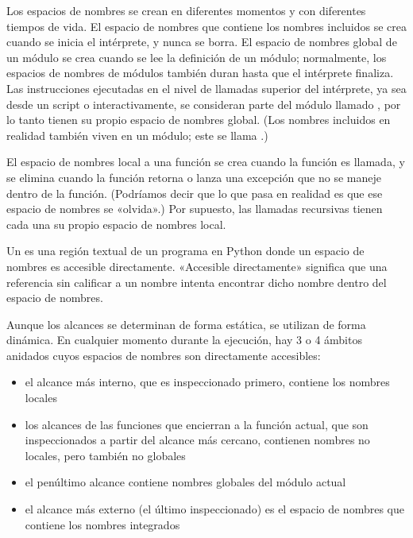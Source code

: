 \documentclass[a4,10pt,spanish]{sphinxmanual}
\begin{document}
\sphinxAtStartPar
Los espacios de nombres se crean en diferentes momentos y con diferentes tiempos de vida.  El espacio de nombres que contiene los nombres incluidos se crea cuando se inicia el intérprete, y nunca se borra.  El espacio de nombres global de un módulo se crea cuando se lee la definición de un módulo; normalmente, los espacios de nombres de módulos también duran hasta que el intérprete finaliza.  Las instrucciones ejecutadas en el nivel de llamadas superior del intérprete, ya sea desde un script o interactivamente, se consideran parte del módulo llamado , por lo tanto tienen su propio espacio de nombres global.  (Los nombres incluidos en realidad también viven en un módulo; este se llama .)

\sphinxAtStartPar
El espacio de nombres local a una función se crea cuando la función es llamada, y se elimina cuando la función retorna o lanza una excepción que no se maneje dentro de la función.  (Podríamos decir que lo que pasa en realidad es que ese espacio de nombres se «olvida».)  Por supuesto, las llamadas recursivas tienen cada una su propio espacio de nombres local.

\sphinxAtStartPar
Un  es una región textual de un programa en Python donde un espacio de nombres es accesible directamente.  «Accesible directamente» significa que una referencia sin calificar a un nombre intenta encontrar dicho nombre dentro del espacio de nombres.

\sphinxAtStartPar
Aunque los alcances se determinan de forma estática, se utilizan de forma dinámica. En cualquier momento durante la ejecución, hay 3 o 4 ámbitos anidados cuyos espacios de nombres son directamente accesibles:
\begin{itemize}
\item {} 
\sphinxAtStartPar
el alcance más interno, que es inspeccionado primero, contiene los nombres locales

\item {} 
\sphinxAtStartPar
los alcances de las funciones que encierran a la función actual, que son inspeccionados a partir del alcance más cercano, contienen nombres no locales, pero también no globales

\item {} 
\sphinxAtStartPar
el penúltimo alcance contiene nombres globales del módulo actual

\item {} 
\sphinxAtStartPar
el alcance más externo (el último inspeccionado) es el espacio de nombres que contiene los nombres integrados

\end{itemize}
\end{document}
